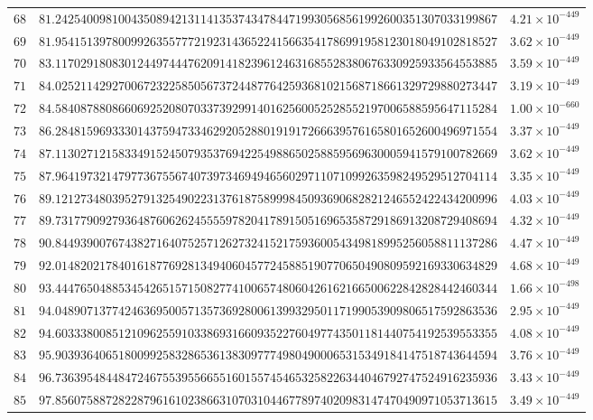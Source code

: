 \documentclass[12pt,reqno]{amsart}
\theoremstyle{remark}
\begin{document}
\begin{longtable}{clc}
$68$ & $81.2425400981004350894213114135374347844719930568561992600351307033199867$ & $4.21\times 10^{-449}$ \\
$69$ & $81.9541513978009926355777219231436522415663541786991958123018049102818527$ & $3.62\times 10^{-449}$ \\
$70$ & $83.1170291808301244974447620914182396124631685528380676330925933564553885$ & $3.59\times 10^{-449}$ \\
$71$ & $84.0252114292700672322585056737244877642593681021568718661329729880273447$ & $3.19\times 10^{-449}$ \\
$72$ & $84.5840878808660692520807033739299140162560052528552197006588595647115284$ & $1.00\times 10^{-660}$ \\
$73$ & $86.2848159693330143759473346292052880191917266639576165801652600496971554$ & $3.37\times 10^{-449}$ \\
$74$ & $87.1130271215833491524507935376942254988650258859569630005941579100782669$ & $3.62\times 10^{-449}$ \\
$75$ & $87.9641973214797736755674073973469494656029711071099263598249529512704114$ & $3.35\times 10^{-449}$ \\
$76$ & $89.1212734803952791325490223137618758999845093690682821246552422434200996$ & $4.03\times 10^{-449}$ \\
$77$ & $89.7317790927936487606262455559782041789150516965358729186913208729408694$ & $4.32\times 10^{-449}$ \\
$78$ & $90.8449390076743827164075257126273241521759360054349818995256058811137286$ & $4.47\times 10^{-449}$ \\
$79$ & $92.0148202178401618776928134940604577245885190770650490809592169330634829$ & $4.68\times 10^{-449}$ \\
$80$ & $93.4447650488534542651571508277410065748060426162166500622842828442460344$ & $1.66\times 10^{-498}$ \\
$81$ & $94.0489071377424636950057135736928006139932950117199053909806517592863536$ & $2.95\times 10^{-449}$ \\
$82$ & $94.6033380085121096255910338693166093522760497743501181440754192539553355$ & $4.08\times 10^{-449}$ \\
$83$ & $95.9039364065180099258328653613830977749804900065315349184147518743644594$ & $3.76\times 10^{-449}$ \\
$84$ & $96.7363954844847246755395566551601557454653258226344046792747524916235936$ & $3.43\times 10^{-449}$ \\
$85$ & $97.8560758872822879616102386631070310446778974020983147470490971053713615$ & $3.49\times 10^{-449}$ \\

\end{longtable}
\end{document}
